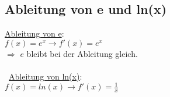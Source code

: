 \subsection{Ableitung von e und ln(x)}
\underline{Ableitung von e}: \\
$f(x) = e^x \rightarrow f'(x) = e^x$ \\
$\Rightarrow$ $e$ bleibt bei der Ableitung gleich. \\\\
\
\underline{Ableitung von ln(x)}: \\
$f(x) = ln(x) \rightarrow f'(x) = \frac{1}{x}$
